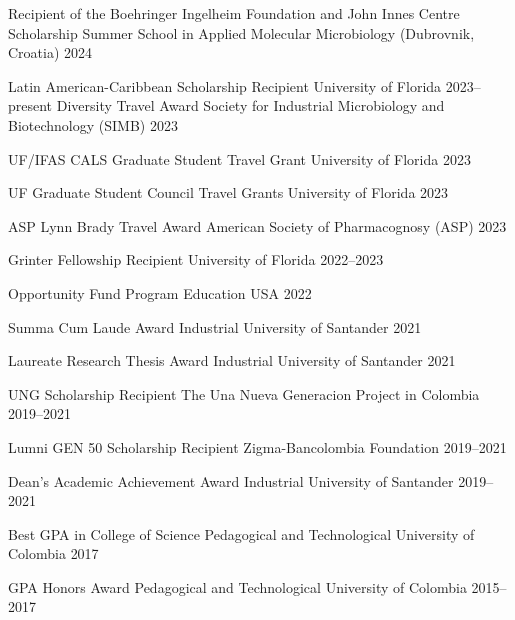 

\begin{cvhonors}
\cvhonor
{Recipient of the Boehringer Ingelheim Foundation and John Innes Centre Scholarship}
{Summer School in Applied Molecular Microbiology (Dubrovnik, Croatia)}
{2024} 

\cvhonor
{Latin American-Caribbean Scholarship Recipient}
{University of Florida}
{2023--present} 
\cvhonor
{Diversity Travel Award}
{Society for Industrial Microbiology and Biotechnology (SIMB)}
{2023} 

\cvhonor
{UF/IFAS CALS Graduate Student Travel Grant}
{University of Florida}
{2023}

\cvhonor
{UF Graduate Student Council Travel Grants}
{University of Florida}
{2023}

\cvhonor
{ASP Lynn Brady Travel Award}
{American Society of Pharmacognosy (ASP)}
{2023}

\cvhonor
{Grinter Fellowship Recipient}
{University of Florida}
{2022--2023}

\cvhonor
{Opportunity Fund Program}
{Education USA}
{2022}

\cvhonor
{Summa Cum Laude Award}
{Industrial University of Santander}
{2021}
%

\cvhonor
{Laureate Research Thesis Award}
{Industrial University of Santander}
{2021}



\cvhonor
{UNG Scholarship Recipient}
{The Una Nueva Generacion Project in Colombia}
{2019--2021}

\cvhonor
{Lumni GEN 50 Scholarship Recipient}
{Zigma-Bancolombia Foundation}
{2019--2021}

\cvhonor
{Dean's Academic Achievement Award}
{Industrial University of Santander}
{2019--2021}

\cvhonor
{Best GPA in College of Science}
{Pedagogical and Technological University of Colombia}
{2017}

%
%

\cvhonor
{GPA Honors Award}
{Pedagogical and Technological University of Colombia}
{2015--2017}

\end{cvhonors}
